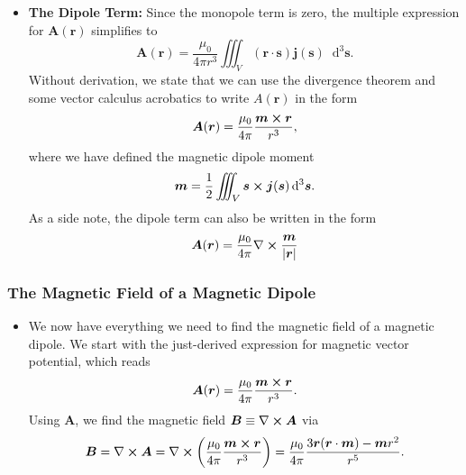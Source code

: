 \documentclass[11pt, a4paper]{article}
\newcommand{\diff}{\mathop{}\!\mathrm{d}} %
\renewcommand{\vec}[1]{\bm{#1}} %
\renewcommand{\r}{\vec{r}}
\newcommand{\B}{\vec{B}} %
\newcommand{\A}{\vec{A}} %
\newcommand{\mm}{\mu_{0}}  %
\newcommand{\m}{\vec{m}}  %
\renewcommand{\j}{\vec{j}}  %
\newcommand{\s}{\vec{s}}  %
\newcommand{\ds}{\diff^{3} \s}  %
\renewcommand{\curl}{\nabla \cross}
\begin{document}
\begin{itemize}
    \item \textbf{The Dipole Term:} Since the monopole term is zero, the multiple expression for $ \A(\r) $ simplifies to
	\begin{equation*}
		 \A(\r) = \frac{\mm}{4\pi r^{3}} \iiint_{V}(\r \cdot \s)\j(\s)\ds.
	\end{equation*}
    Without derivation, we state that we can use the divergence theorem and some vector calculus acrobatics to write $ A(\r) $ in the form
	\begin{equation*}
		\A(\r) = \frac{\mm}{4\pi}\frac{\m \cross \r}{r^{3}},
	\end{equation*}
	where we have defined the magnetic dipole moment
	\begin{equation*}
		\m = \frac{1}{2}\iiint_{V} \s \cross \j(\s) \ds.
	\end{equation*}
	As a side note, the dipole term can also be written in the form
	\begin{equation*}
		\A(\r) =  \frac{\mm}{4\pi} \curl \frac{\m}{\abs{\r}}
	\end{equation*}
\end{itemize}

\subsubsection{The Magnetic Field of a Magnetic Dipole}
\begin{itemize}
	\item We now have everything we need to find the magnetic field of a magnetic dipole. We start with the just-derived expression for magnetic vector potential, which reads
	\begin{equation*}
		\A(\r) = \frac{\mm}{4\pi}\frac{\m \cross \r}{r^{3}}.
	\end{equation*}
	Using $ \A $, we find the magnetic field $ \B \equiv \curl \A $ via
	\begin{equation*}
		\B = \curl \A = \curl \left(\frac{\mm}{4\pi}\frac{\m \cross \r}{r^{3}}\right) = \frac{\mm}{4\pi} \frac{3\r(\r \cdot \m) - \m r^{2}}{r^{5}}.
	\end{equation*}
	
\end{itemize}
\end{document}
